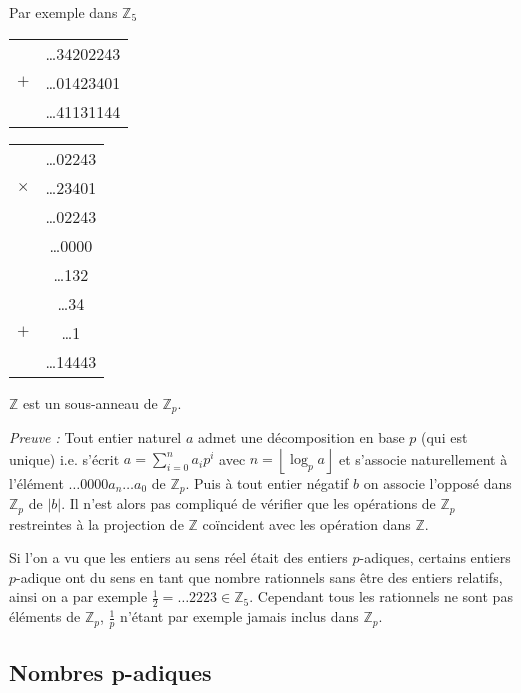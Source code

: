 Par exemple dans $\mathbb{Z}_5$ 

\begin{tabular}{lS}
     & \ldots34202243\\
  $+$& \ldots01423401\\
  \hline
  & \ldots 41131144 \\
  
\end{tabular}

\begin{tabular}{lS}
     & \ldots02243\\
  $\times $& \ldots23401\\
  \hline
  & \ldots 02243\\
  & \ldots 0000 \\
  & \ldots 132\\
  & \ldots 34\\
  $+$ & \ldots 1\\
\hline
& \ldots14443	
\end{tabular}

\begin{propriete}
	 $\mathbb{Z}$ est un sous-anneau de $\mathbb{Z}_p$. 	
\end{propriete}
\textit{Preuve :} Tout entier naturel $a$ admet une décomposition en base $p$ (qui est unique) i.e. s'écrit $a = \sum\limits_{i=0}^{n} a_{i}p^i$ avec $n = \left\lfloor \log_p a\right\rfloor$ et s'associe naturellement à l'élément $\ldots0000a_n\ldots a_0$ de $\mathbb{Z}_p$. Puis à tout entier négatif $b$ on associe l'opposé dans $\mathbb{Z}_p$ de $|b|$. Il n'est alors pas compliqué de vérifier que les opérations de $\mathbb{Z}_p$ restreintes à la projection de $\mathbb{Z}$ coïncident avec les opération dans $\mathbb{Z}$. \hfill \qedsymbol

\begin{remarque}
	Si l'on a vu que les entiers au sens réel était des entiers $p$-adiques, certains entiers $p$-adique ont du sens en tant que nombre rationnels sans être des entiers relatifs, ainsi on a par exemple $\frac{1}{2} = \ldots 2223 \in \mathbb{Z}_5$. Cependant tous les rationnels ne sont pas éléments de $\mathbb{Z}_p$, $\frac{1}{p}$ n'étant par exemple jamais inclus dans $\mathbb{Z}_p$.
\end{remarque}

\subsection{Nombres \texorpdfstring{p}{$p$}-adiques}

